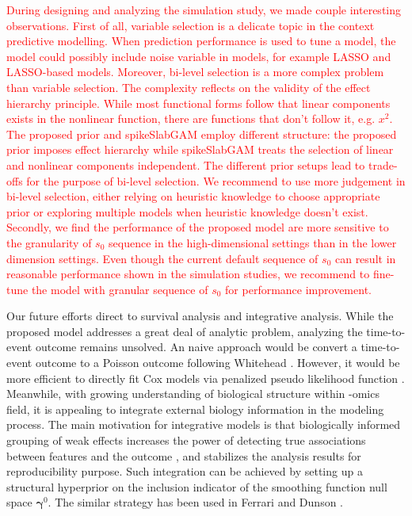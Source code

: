 \documentclass[AMA,STIX1COL,]{WileyNJD-v2}
\begin{document}
\textcolor{red}{During designing and analyzing the simulation study, we made couple interesting observations. First of all, variable selection is a delicate topic in the context predictive modelling. When prediction performance is used to tune a model, the model could possibly include noise variable in models, for example LASSO and LASSO-based models. \cite{Wu2019} Moreover, bi-level selection is a more complex problem than variable selection. The complexity reflects on the validity of the effect hierarchy principle. While most functional forms follow that linear components exists in the nonlinear function, there are functions that don't follow it, e.g. $x^2$. The proposed prior and spikeSlabGAM employ different structure: the proposed prior imposes effect hierarchy while spikeSlabGAM treats the selection of linear and nonlinear components independent. The different prior setups lead to trade-offs for the purpose of bi-level selection. We recommend to use more judgement in bi-level selection, either relying on heuristic knowledge to choose appropriate prior or exploring multiple models when heuristic knowledge doesn't exist. Secondly, we find the performance of the proposed model are more sensitive to the granularity of $s_0$ sequence in the high-dimensional settings than in the lower dimension settings. Even though the current default sequence of $s_0$ can result in reasonable performance shown in the simulation studies, we recommend to fine-tune the model with granular sequence of $s_0$ for performance improvement.}

Our future efforts direct to survival analysis and integrative analysis.
While the proposed model addresses a great deal of analytic problem,
analyzing the time-to-event outcome remains unsolved. An naive approach
would be convert a time-to-event outcome to a Poisson outcome following
Whitehead \citep{Whitehead1980}. However, it would be more efficient to
directly fit Cox models via penalized pseudo likelihood function
\citep{Simon2011}. Meanwhile, with growing understanding of biological
structure within -omics field, it is appealing to integrate external
biology information in the modeling process. The main motivation for
integrative models is that biologically informed grouping of weak
effects increases the power of detecting true associations between
features and the outcome \citep{Peterson2016}, and stabilizes the
analysis results for reproducibility purpose. Such integration can be
achieved by setting up a structural hyperprior on the inclusion
indicator of the smoothing function null space
\(\boldsymbol{\gamma}^0\). The similar strategy has been used in Ferrari
and Dunson \citep{Ferrari2020}.
\end{document}
